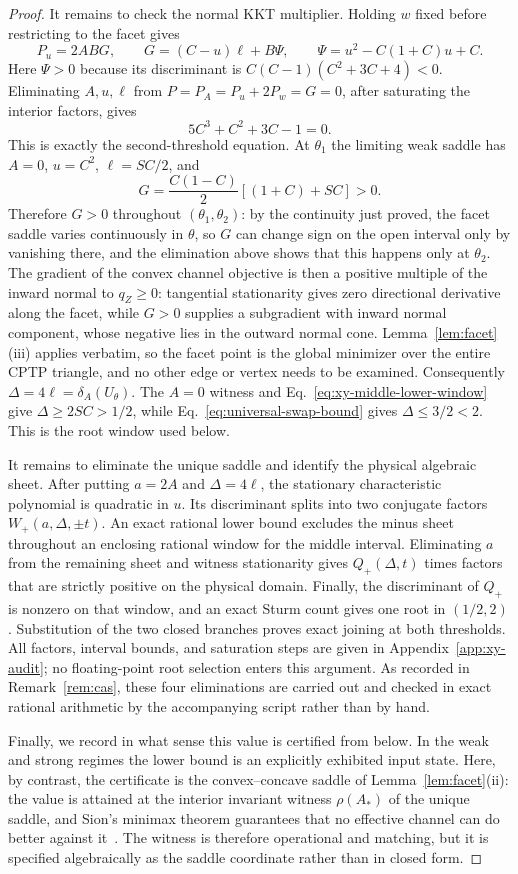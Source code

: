 \documentclass[11pt,a4paper]{article}
\theoremstyle{remark}
\begin{document}
\begin{proof}
It remains to check the normal KKT multiplier.  Holding $w$ fixed before
restricting to the facet gives
\[
 P_u=2ABG,\qquad
 G=(C-u)\ell+B\Psi,\qquad
 \Psi=u^2-C(1+C)u+C.
\]
Here $\Psi>0$ because its discriminant is
$C(C-1)(C^2+3C+4)<0$.  Eliminating $A,u,\ell$ from
$P=P_A=P_u+2P_w=G=0$, after saturating the interior factors, gives
\[
 5C^3+C^2+3C-1=0.
\]
This is exactly the second-threshold equation.  At $\theta_1$ the
limiting weak saddle has $A=0$, $u=C^2$, $\ell=SC/2$, and
\[
 G=\frac{C(1-C)}2[(1+C)+SC]>0.
\]
Therefore $G>0$ throughout $(\theta_1,\theta_2)$: by
the continuity just proved, the facet saddle varies continuously in $\theta$,
so $G$ can change sign on the open interval only by vanishing there, and the
elimination above shows that this happens only at $\theta_2$.  The gradient
of the convex channel objective is then a positive multiple of the inward
normal to $q_Z\geq0$: tangential stationarity gives zero directional
derivative along the facet, while $G>0$ supplies a subgradient with inward
normal component, whose negative lies in the outward normal cone.
Lemma~\ref{lem:facet}(iii) applies verbatim, so the facet point is the global
minimizer over the entire CPTP triangle, and no other edge or vertex needs to
be examined.
Consequently $\Delta=4\ell=\delta_A(U_\theta)$.  The $A=0$ witness and
Eq.~\eqref{eq:xy-middle-lower-window} give
$\Delta\geq2SC>1/2$, while
Eq.~\eqref{eq:universal-swap-bound} gives $\Delta\leq3/2<2$.  This is the
root window used below.

It remains to eliminate the unique saddle and identify the physical algebraic
sheet.  After putting $a=2A$ and $\Delta=4\ell$, the stationary characteristic
polynomial is quadratic in $u$.  Its discriminant splits into two conjugate
factors $W_+(a,\Delta,\pm t)$.  An exact rational lower bound excludes the
minus sheet throughout an enclosing rational window for the middle interval.
Eliminating $a$ from the remaining sheet and witness stationarity gives
$Q_+(\Delta,t)$ times factors that are strictly positive on the physical
domain.  Finally, the discriminant of $Q_+$ is nonzero on that window, and an
exact Sturm count gives one root in $(1/2,2)$.  Substitution of the two closed
branches proves exact joining at both thresholds.  All factors, interval
bounds, and saturation steps are given in
Appendix~\ref{app:xy-audit}; no floating-point root selection enters this
argument.  As recorded in Remark~\ref{rem:cas}, these four eliminations are
carried out and checked in exact rational arithmetic by the accompanying
script rather than by hand.

Finally, we record in what sense this value is certified from below.  In the
weak and strong regimes the lower bound is an explicitly exhibited input
state.  Here, by contrast, the certificate is the convex--concave saddle of
Lemma~\ref{lem:facet}(ii): the value is attained at the interior invariant
witness $\rho(A_*)$ of the unique saddle, and Sion's minimax theorem
guarantees that no effective channel can do better against
it~\cite{sion1958}.  The witness is
therefore operational and matching, but it is specified algebraically as the
saddle coordinate rather than in closed form.
\end{proof}
\end{document}
